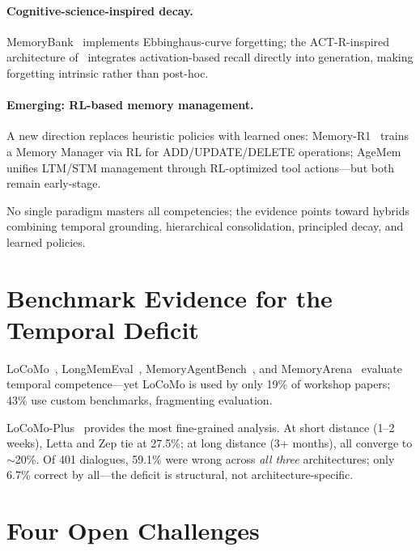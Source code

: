 \documentclass[runningheads]{llncs}
\begin{document}
\paragraph{Cognitive-science-inspired decay.}
MemoryBank~\cite{zhong2024} implements Ebbinghaus-curve forgetting; the
ACT-R-inspired architecture of~\cite{actr2025} integrates
activation-based recall directly into generation, making forgetting
intrinsic rather than post-hoc.

\paragraph{Emerging: RL-based memory management.}
A new direction replaces heuristic policies with learned ones:
Memory-R1~\cite{memoryr1_2025} trains a Memory Manager via RL for
ADD/UPDATE/DELETE operations; AgeMem~\cite{agemem2026} unifies LTM/STM
management through RL-optimized tool actions---but both remain
early-stage.

No single paradigm masters all competencies; the evidence points toward
hybrids combining temporal grounding, hierarchical consolidation,
principled decay, and learned policies.

\section{Benchmark Evidence for the Temporal Deficit}

LoCoMo~\cite{maharana2024}, LongMemEval~\cite{wu2025},
MemoryAgentBench~\cite{memoryagentbench2026}, and
MemoryArena~\cite{memoryarena2026} evaluate temporal competence---yet
LoCoMo is used by only 19\% of workshop papers; 43\% use custom
benchmarks, fragmenting evaluation.

LoCoMo-Plus~\cite{gurawaliya2026} provides the most fine-grained
analysis. At short distance (1--2 weeks), Letta and Zep tie at 27.5\%;
at long distance (3+ months), all converge to $\sim$20\%. Of 401
dialogues, 59.1\% were wrong across \emph{all three} architectures;
only 6.7\% correct by all---the deficit is structural, not
architecture-specific.

\section{Four Open Challenges}
\end{document}
